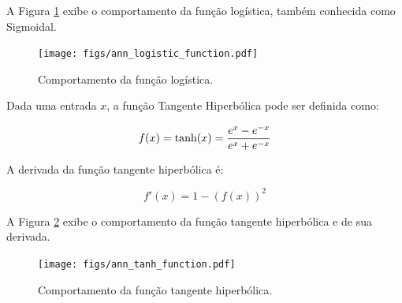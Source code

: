 A Figura \ref{fig:ann_logistic_function} exibe o comportamento da função logística, também conhecida como Sigmoidal.

\begin{figure}[H]
    \centering
    \texttt{[image: figs/ann\_logistic\_function.pdf]}

    \caption{Comportamento da função logística.}
    \label{fig:ann_logistic_function}
\end{figure}





\linebreak
\newpage


\begin{definition}
    Dada uma entrada $x$, a função Tangente Hiperbólica pode ser definida como:

    \begin{equation}
        f(x) = \text{tanh}(x) = \dfrac{e^{x} - e^{-x}}{e^{x} + e^{-x}}
        \vspace{0.2cm}
        \label{eq:ann_tanh_function}
    \end{equation}

    A derivada da função tangente hiperbólica é:

    \begin{equation}
        f'(x) = 1 - (f(x))^{2}
        \label{eq:ann_tanh_function_dy}
    \end{equation}

\end{definition}

A Figura \ref{fig:ann_tanh_function} exibe o comportamento da função tangente hiperbólica e de sua derivada.

\begin{figure}[H]
    \centering
    \texttt{[image: figs/ann\_tanh\_function.pdf]}

    \caption{Comportamento da função tangente hiperbólica.}
    \label{fig:ann_tanh_function}
\end{figure}











